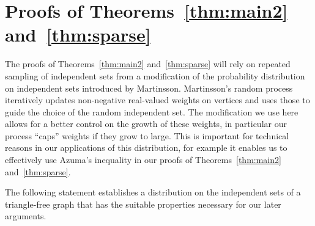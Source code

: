 \documentclass[10pt]{amsart}
\theoremstyle{definition}
\begin{document}
\section{Proofs of Theorems~\ref{thm:main2} and~\ref{thm:sparse}}
The proofs of Theorems~\ref{thm:main2} and~\ref{thm:sparse} will rely on repeated sampling of independent sets from a modification of the probability distribution on independent sets introduced by Martinsson. Martinsson's random process iteratively updates non-negative real-valued weights on vertices and uses those to guide the choice of the random independent set. The modification we use here allows for a better control on the growth of these weights, in particular our process ``caps'' weights if they grow to large. This is important for technical reasons in our applications of this distribution, for example it enables us to effectively use Azuma's inequality in our proofs of Theorems~\ref{thm:main2} and~\ref{thm:sparse}.

The following statement establishes a distribution on the independent sets of a triangle-free graph that has the suitable properties necessary for our later arguments.
\end{document}
